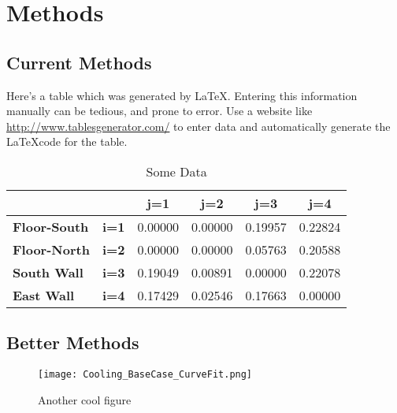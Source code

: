 \chapter{Methods}
\label{ch:Methods}

\section{Current Methods}

Here's a table which was generated by \LaTeX. Entering this information manually can be tedious, and prone to error. Use a website like \url{http://www.tablesgenerator.com/} to enter data and automatically generate the \LaTeX code for the table.

\begin{table}[h]
\centering
\caption{Some Data}
\label{tab:data}
\begin{tabular}{|l|c|c|c|c|c|}
\hline
                     &              & \textbf{j=1} & \textbf{j=2} & \textbf{j=3} & \textbf{j=4} \\ \hline
\textbf{Floor-South} & \textbf{i=1} & 0.00000      & 0.00000      & 0.19957      & 0.22824      \\ \hline
\textbf{Floor-North} & \textbf{i=2} & 0.00000      & 0.00000      & 0.05763      & 0.20588      \\ \hline
\textbf{South Wall}  & \textbf{i=3} & 0.19049      & 0.00891      & 0.00000      & 0.22078      \\ \hline
\textbf{East Wall}   & \textbf{i=4} & 0.17429      & 0.02546      & 0.17663      & 0.00000      \\ \hline
\end{tabular}
\end{table}

\section{Better Methods}

\lipsum[1]

\begin{figure}
	\centering
	\texttt{[image: Cooling\_BaseCase\_CurveFit.png]}
	\caption{Another cool figure}
	\label{fig:another cool figure}
\end{figure}
